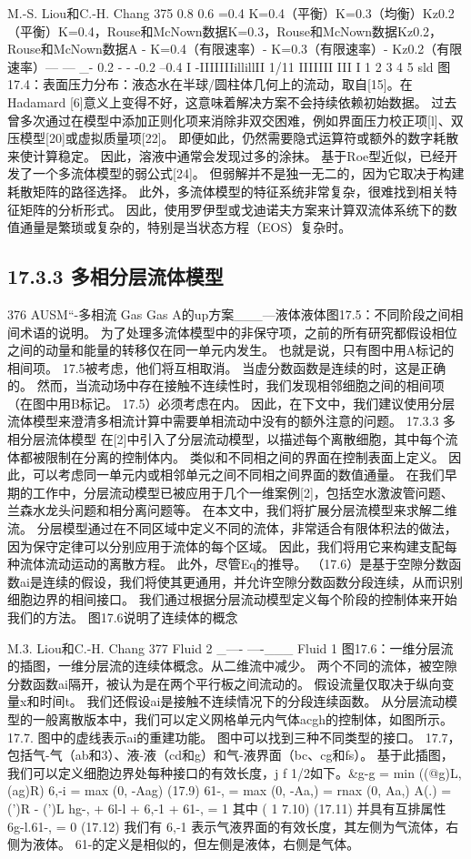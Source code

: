 \documentclass[UTF8,11pt,a4paper,openany,fontset=fandol]{ctexbook}
\begin{document}
M.-S. Liou和C.-H. Chang 375 0.8 0.6 =0.4 K=0.4（平衡）K=0.3（均衡）Kz0.2（平衡）K=0.4，Rouse和McNown数据K=0.3，Rouse和McNown数据Kz0.2，Rouse和McNown数据A - K=0.4（有限速率）- K=0.3（有限速率）- Kz0.2（有限速率）--- --- \_- 0.2 - - -0.2 --0.4 I -IIIIIIIillillII 1/11 IIIIIII III I 1 2 3 4 5 sld 图17.4：表面压力分布：液态水在半球/圆柱体几何上的流动，取自[15]。在Hadamard [6]意义上变得不好，这意味着解决方案不会持续依赖初始数据。 过去曾多次通过在模型中添加正则化项来消除非双交困难，例如界面压力校正项[l]、双压模型[20]或虚拟质量项[22]。 即便如此，仍然需要隐式运算符或额外的数字耗散来使计算稳定。 因此，溶液中通常会发现过多的涂抹。 基于Roe型近似，已经开发了一个多流体模型的弱公式[24]。 但弱解并不是独一无二的，因为它取决于构建耗散矩阵的路径选择。 此外，多流体模型的特征系统非常复杂，很难找到相关特征矩阵的分析形式。 因此，使用罗伊型或戈迪诺夫方案来计算双流体系统下的数值通量是繁琐或复杂的，特别是当状态方程（EOS）复杂时。

\subsection{17.3.3 多相分层流体模型}
376 AUSM“-多相流 Gas Gas A的up方案\_\_\_---液体液体图17.5：不同阶段之间相间术语的说明。 为了处理多流体模型中的非保守项，之前的所有研究都假设相位之间的动量和能量的转移仅在同一单元内发生。 也就是说，只有图中用A标记的相间项。 17.5被考虑，他们将互相取消。 当虚分数函数是连续的时，这是正确的。 然而，当流动场中存在接触不连续性时，我们发现相邻细胞之间的相间项（在图中用B标记。 17.5）必须考虑在内。 因此，在下文中，我们建议使用分层流体模型来澄清多相流计算中需要单相流动中没有的额外注意的问题。 17.3.3 多相分层流体模型 在[2]中引入了分层流动模型，以描述每个离散细胞，其中每个流体都被限制在分离的控制体内。 类似和不同相之间的界面在控制表面上定义。 因此，可以考虑同一单元内或相邻单元之间不同相之间界面的数值通量。 在我们早期的工作中，分层流动模型已被应用于几个一维案例[2]，包括空水激波管问题、兰森水龙头问题和相分离问题等。 在本文中，我们将扩展分层流模型来求解二维流。 分层模型通过在不同区域中定义不同的流体，非常适合有限体积法的做法，因为保守定律可以分别应用于流体的每个区域。 因此，我们将用它来构建支配每种流体流动运动的离散方程。 此外，尽管Eq的推导。 （17.6）是基于空隙分数函数ai是连续的假设，我们将使其更通用，并允许空隙分数函数分段连续，从而识别细胞边界的相间接口。 我们通过根据分层流动模型定义每个阶段的控制体来开始我们的方法。 图17.6说明了连续体的概念

M.3. Liou和C.-H. Chang 377 Fluid 2 \_---- ----\_\_\_ Fluid 1 图17.6：一维分层流的插图，一维分层流的连续体概念。从二维流中减少。 两个不同的流体，被空隙分数函数ai隔开，被认为是在两个平行板之间流动的。 假设流量仅取决于纵向变量x和时间t。 我们还假设ai是接触不连续情况下的分段连续函数。 从分层流动模型的一般离散版本中，我们可以定义网格单元内气体acgh的控制体，如图所示。 17.7. 图中的虚线表示ai的重建功能。 图中可以找到三种不同类型的接口。 17.7，包括气-气（ab和3）、液-液（cd和g）和气-液界面（bc、cg和fs）。 基于此插图，我们可以定义细胞边界处每种接口的有效长度，j f 1/2如下。\&g-g = min ((@g)L, (ag)R) 6,-i = max (0, -Aag) (17.9) 61-, = max (0, -Aa,) = rnax (0, Aa,) A(.) = (')R - (')L hg-, + 6l-l + 6,-1 + 61-, = 1 其中 ( 1 7.10) (17.11) 并具有互排属性 6g-l.61-, = 0 (17.12) 我们有 6,-1 表示气液界面的有效长度，其左侧为气流体，右侧为液体。 61-的定义是相似的，但左侧是液体，右侧是气体。
\end{document}
